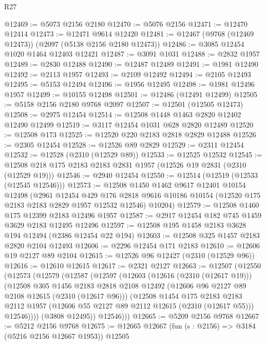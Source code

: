 \begin{lexlean}{R27}
\begin{coremodule}
@12469 := @5073 @2156 @2180
@12470 := @5076 @2156
@12471 := @12470 @12414
@12473 := @12471 @9614 @12420
@12481 := @12467 (@9768 (@12469 @12473)) (@2097 (@5138 @2156 @2180 @12473))
@12486 := @3085 @12454 @1020 @1464 @12403 @12421
@12487 := @3091 @1031
@12488 := @2832 @1957
@12489 := @2830 @12488
@12490 := @12487 @12489
@12491 := @1981 @12490
@12492 := @2113 @1957
@12493 := @2109 @12492
@12494 := @2105 @12493
@12495 := @5153 @12494
@12496 := @1956 @12495
@12498 := @1981 @12496 @1957
@12499 := @10155 @12498
@12501 := @12486 (@12491 @12499)
@12505 := @5158 @2156 @2180 @9768 @2097
@12507 := @12501 (@12505 @12473)
@12508 := @2975 @12454
@12514 := @12508 @1448 @1463 @2820 @12402 @12490 @12499
@12519 := @3117 @12454 @1031 @628 @2820 @12489
@12520 := @12508 @173
@12525 := @12520 @220 @2183 @2818 @2829 @12488
@12526 := @2305 @12454
@12528 := @12526 @89 @2829
@12529 := @2311 @12454
@12532 := @12528 (@2310 (@12529 @89))
@12533 := @12525 @12532
@12545 := @12508 @218 @175 @2183 @2183 @2831 @1957 (@12526 @19 @2831 (@2310 (@12529 @19)))
@12546 := @2940 @12454
@12550 := @12514 (@12519 (@12533 (@12545 @12546)))
@12573 := @12508
    @1450
    @1462
    @9617
    @12401
    @10154
    @12498
    (@2961
      @12454
      @429
      @176
      @2818
      @9616
      @10186
      @10154
      (@12520 @175 @2183 @2183 @2829 @1957 @12532 @12546)
      @10204)
@12579 := @12508 @1460 @175 @12399 @2183 @12496 @1957
@12587 := @2917 @12454 @182 @745 @1459 @3629 @2183 @12495 @12496
@12597 := @12508 @195 @1458 @2183 @3628 @194 @12494 (@2386 @12454 @22 @194)
@12603 := @12508 @325 @1457 @2183 @2820 @2104 @12493
@12606 := @2296 @12454 @171 @2183
@12610 := @12606 @19 @2127 @89 @2104
@12615 := @12526 @96 @12427 (@2310 (@12529 @96))
@12616 := @12610 @12615
@12617 := @2321 @2127
@12663 := @12507
    (@12550
      (@12573
        (@12579
          (@12587
            (@12597
              (@12603
                (@12616 (@2310 (@12617 @19)))
                (@12508
                  @305
                  @1456
                  @2183
                  @2818
                  @2108
                  @12492
                  (@12606 @96 @2127 @89 @2108 @12615 (@2310 (@12617 @96)))
                  (@12508
                    @1454
                    @175
                    @2183
                    @2183
                    @2112
                    @1957
                    (@12606 @55 @2127 @89 @2112 @12615 (@2310 (@12617 @55)))
                    @12546))))
            (@3808 @12495))
          @12546)))
@12665 := @5209 @2156 @9768
@12667 := @5212 @2156 @9768
@12675 := @12665 @12667 (fun (s : @2156) => @3184 (@5216 @2156 @12667 @1953)) @12505

\end{coremodule}
\end{lexlean}
